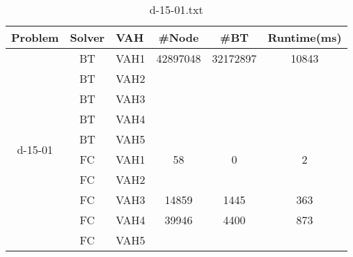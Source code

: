 \documentclass{article}
\begin{document}
\begin{table}[]
\caption{d-15-01.txt}
\begin{tabular}{|c|c|c|c|c|c|}
\hline
Problem & Solver & \multicolumn{1}{l|}{VAH} & \#Node & \#BT & \multicolumn{1}{l|}{Runtime(ms)} \\ \hline
\multirow{10}{*}{d-15-01} & BT & VAH1 & 42897048 & 32172897 & 10843 \\ \cline{2-6} 
 & BT & VAH2 &  &  &  \\ \cline{2-6} 
 & BT & VAH3 &  &  &  \\ \cline{2-6} 
 & BT & VAH4 &  &  &  \\ \cline{2-6} 
 & BT & VAH5 &  &  &  \\ \cline{2-6} 
 & FC & VAH1 & 58 & 0 & 2 \\ \cline{2-6} 
 & FC & VAH2 &  &  &  \\ \cline{2-6} 
 & FC & VAH3 & 14859 & 1445 & 363 \\ \cline{2-6} 
 & FC & VAH4 & 39946 & 4400 & 873 \\ \cline{2-6} 
 & FC & VAH5 &  &  &  \\ \hline
\end{tabular}
\end{table}
\end{document}
